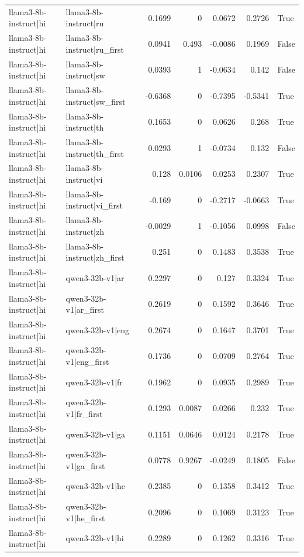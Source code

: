\begin{table}
\begin{tabular}{l l r r r r l}
llama3-8b-instruct|hi & llama3-8b-instruct|ru & 0.1699 & 0 & 0.0672 & 0.2726 & True \\
llama3-8b-instruct|hi & llama3-8b-instruct|ru_first & 0.0941 & 0.493 & -0.0086 & 0.1969 & False \\
llama3-8b-instruct|hi & llama3-8b-instruct|sw & 0.0393 & 1 & -0.0634 & 0.142 & False \\
llama3-8b-instruct|hi & llama3-8b-instruct|sw_first & -0.6368 & 0 & -0.7395 & -0.5341 & True \\
llama3-8b-instruct|hi & llama3-8b-instruct|th & 0.1653 & 0 & 0.0626 & 0.268 & True \\
llama3-8b-instruct|hi & llama3-8b-instruct|th_first & 0.0293 & 1 & -0.0734 & 0.132 & False \\
llama3-8b-instruct|hi & llama3-8b-instruct|vi & 0.128 & 0.0106 & 0.0253 & 0.2307 & True \\
llama3-8b-instruct|hi & llama3-8b-instruct|vi_first & -0.169 & 0 & -0.2717 & -0.0663 & True \\
llama3-8b-instruct|hi & llama3-8b-instruct|zh & -0.0029 & 1 & -0.1056 & 0.0998 & False \\
llama3-8b-instruct|hi & llama3-8b-instruct|zh_first & 0.251 & 0 & 0.1483 & 0.3538 & True \\
llama3-8b-instruct|hi & qwen3-32b-v1|ar & 0.2297 & 0 & 0.127 & 0.3324 & True \\
llama3-8b-instruct|hi & qwen3-32b-v1|ar_first & 0.2619 & 0 & 0.1592 & 0.3646 & True \\
llama3-8b-instruct|hi & qwen3-32b-v1|eng & 0.2674 & 0 & 0.1647 & 0.3701 & True \\
llama3-8b-instruct|hi & qwen3-32b-v1|eng_first & 0.1736 & 0 & 0.0709 & 0.2764 & True \\
llama3-8b-instruct|hi & qwen3-32b-v1|fr & 0.1962 & 0 & 0.0935 & 0.2989 & True \\
llama3-8b-instruct|hi & qwen3-32b-v1|fr_first & 0.1293 & 0.0087 & 0.0266 & 0.232 & True \\
llama3-8b-instruct|hi & qwen3-32b-v1|ga & 0.1151 & 0.0646 & 0.0124 & 0.2178 & True \\
llama3-8b-instruct|hi & qwen3-32b-v1|ga_first & 0.0778 & 0.9267 & -0.0249 & 0.1805 & False \\
llama3-8b-instruct|hi & qwen3-32b-v1|he & 0.2385 & 0 & 0.1358 & 0.3412 & True \\
llama3-8b-instruct|hi & qwen3-32b-v1|he_first & 0.2096 & 0 & 0.1069 & 0.3123 & True \\
llama3-8b-instruct|hi & qwen3-32b-v1|hi & 0.2289 & 0 & 0.1262 & 0.3316 & True \\

\end{tabular}
\end{table}

